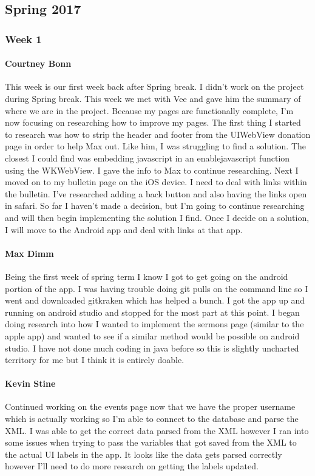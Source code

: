 	\subsection{Spring 2017}

		\subsubsection{Week 1}

			\paragraph{Courtney Bonn}
			This week is our first week back after Spring break. I didn't work on the project during Spring break. This week we met with Vee and gave him the summary of where we are in the project. Because my pages are functionally complete, I'm now focusing on researching how to improve my pages. The first thing I started to research was how to strip the header and footer from the UIWebView donation page in order to help Max out. Like him, I was struggling to find a solution. The closest I could find was embedding javascript in an enablejavascript function using the WKWebView. I gave the info to Max to continue researching. Next I moved on to my bulletin page on the iOS device. I need to deal with links within the bulletin. I've researched adding a back button and also having the links open in safari. So far I haven't made a decision, but I'm going to continue researching and will then begin implementing the solution I find. Once I decide on a solution, I will move to the Android app and deal with links at that app.

			\paragraph{Max Dimm}
			Being the first week of spring term I know I got to get going on the android portion of the app. I was having trouble doing git pulls on the command line so I went and downloaded gitkraken which has helped a bunch. I got the app up and running on android studio and stopped for the most part at this point. I began doing research into how I wanted to implement the sermons page (similar to the apple app) and wanted to see if a similar method would be possible on android studio. I have not done much coding in java before so this is slightly uncharted territory for me but I think it is entirely doable.

			\paragraph{Kevin Stine}
			Continued working on the events page now that we have the proper username which is actually working so I'm able to connect to the database and parse the XML. I was able to get the correct data parsed from the XML however I ran into some issues when trying to pass the variables that got saved from the XML to the actual UI labels in the app. It looks like the data gets parsed correctly however I'll need to do more research on getting the labels updated.

